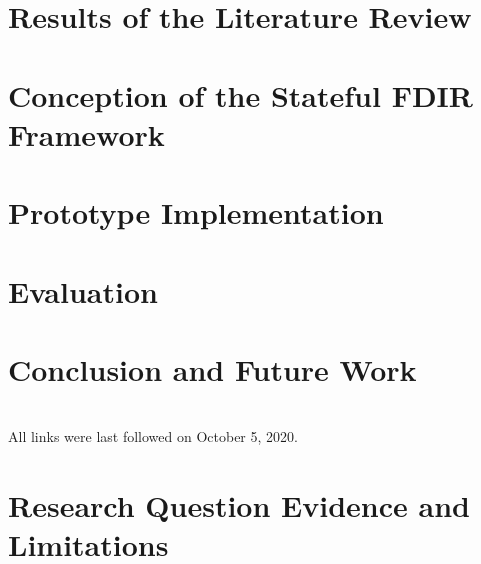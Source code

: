 \documentclass[
  numbers=noenddot,
  english,  %
  a4paper,  %
  twoside,  %
  bibliography=totoc,
  headsepline,
  cleardoublepage=empty,
  parskip=half,
  draft=false
]{scrbook}
\theoremstyle{break}
\begin{document}
\chapter{Results of the Literature Review}
\label{chap:literature-review-results}


\chapter{Conception of the Stateful FDIR Framework}
\label{chap:conception}


\chapter{Prototype Implementation}
\label{chap:implementation}


\chapter{Evaluation}
\label{chap:evaluation}


\chapter{Conclusion and Future Work}
\label{chap:conclusion}



\printbibliography

\ \\
%
\noindent
All links were last followed on October 5, 2020.



\clearpage
\appendix

\chapter{Research Question Evidence and Limitations}\label{sec:appendix-rq-details}



\pagestyle{empty}
\renewcommand*{\chapterpagestyle}{empty}
\Versicherung
\end{document}
